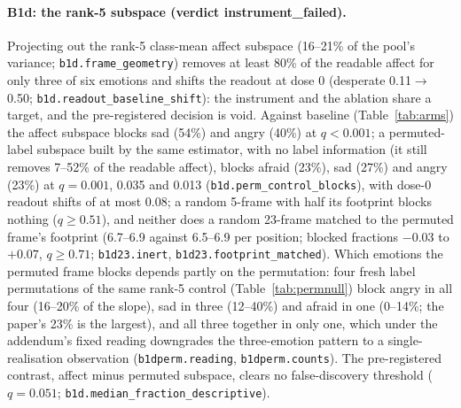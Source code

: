 \documentclass[11pt]{article}
\newcommand{\rid}[1]{{\footnotesize\texttt{#1}}}
\begin{document}
\paragraph{B1d: the rank-5 subspace (verdict instrument\_failed).} Projecting out the rank-5 class-mean affect subspace (16--21\% of the pool's variance; \rid{b1d.frame\_geometry}) removes at least 80\% of the readable affect for only three of six emotions and shifts the readout at dose 0 (desperate 0.11$\to$0.50; \rid{b1d.readout\_baseline\_shift}): the instrument and the ablation share a target, and the pre-registered decision is void. Against baseline (Table~\ref{tab:arms}) the affect subspace blocks sad (54\%) and angry (40\%) at $q<0.001$; a permuted-label subspace built by the same estimator, with no label information (it still removes 7--52\% of the readable affect), blocks afraid (23\%), sad (27\%) and angry (23\%) at $q = 0.001$, 0.035 and 0.013 (\rid{b1d.perm\_control\_blocks}), with dose-0 readout shifts of at most 0.08; a random 5-frame with half its footprint blocks nothing ($q \ge 0.51$), and neither does a random 23-frame matched to the permuted frame's footprint (6.7--6.9 against 6.5--6.9 per position; blocked fractions $-0.03$ to $+0.07$, $q \ge 0.71$; \rid{b1d23.inert}, \rid{b1d23.footprint\_matched}). Which emotions the permuted frame blocks depends partly on the permutation: four fresh label permutations of the same rank-5 control (Table~\ref{tab:permnull}) block angry in all four (16--20\% of the slope), sad in three (12--40\%) and afraid in one (0--14\%; the paper's 23\% is the largest), and all three together in only one, which under the addendum's fixed reading downgrades the three-emotion pattern to a single-realisation observation (\rid{b1dperm.reading}, \rid{b1dperm.counts}). The pre-registered contrast, affect minus permuted subspace, clears no false-discovery threshold ($q=0.051$; \rid{b1d.median\_fraction\_descriptive}).
\end{document}
